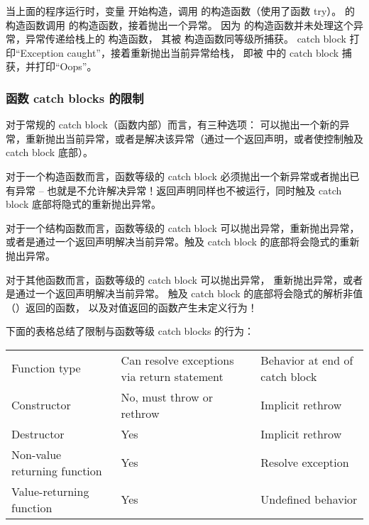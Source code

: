\documentclass[../../LearnCpp.tex]{subfiles}
\begin{document}
当上面的程序运行时，变量  开始构造，调用  的构造函数（使用了函数 try）。
 的构造函数调用  的构造函数，接着抛出一个异常。
因为  的构造函数并未处理这个异常，异常传递给栈上的  构造函数，
其被  构造函数同等级所捕获。
catch block 打印“Exception caught”，接着重新抛出当前异常给栈，
即被  中的 catch block 捕获，并打印“Oops”。

\subsubsection*{函数 catch blocks 的限制}

对于常规的 catch block（函数内部）而言，有三种选项：
可以抛出一个新的异常，重新抛出当前异常，或者是解决该异常（通过一个返回声明，或者使控制触及 catch block 底部）。

对于一个构造函数而言，函数等级的 catch block 必须抛出一个新异常或者抛出已有异常 --
也就是不允许解决异常！返回声明同样也不被运行，同时触及 catch block 底部将隐式的重新抛出异常。

对于一个结构函数而言，函数等级的 catch block 可以抛出异常，重新抛出异常，
或者是通过一个返回声明解决当前异常。触及 catch block 的底部将会隐式的重新抛出异常。

对于其他函数而言，函数等级的 catch block 可以抛出异常，
重新抛出异常，或者是通过一个返回声明解决当前异常。
触及 catch block 的底部将会隐式的解析非值（）返回的函数，
以及对值返回的函数产生未定义行为！

下面的表格总结了限制与函数等级 catch blocks 的行为：

\begin{center}
  \begin{tiny}
    \begin{tabularx}{ 1\textwidth}{
        | >{\raggedright\arraybackslash}X
        | >{\raggedright\arraybackslash}X
        | >{\raggedright\arraybackslash}X |
      }
      \hline
      Function type                & Can resolve exceptions via return statement & Behavior at end of catch block \\
      Constructor                  & No, must throw or rethrow                   & Implicit rethrow               \\
      Destructor                   & Yes                                         & Implicit rethrow               \\
      Non-value returning function & Yes                                         & Resolve exception              \\
      Value-returning function     & Yes                                         & Undefined behavior             \\
    \end{tabularx}
  \end{tiny}
\end{center}
\end{document}
